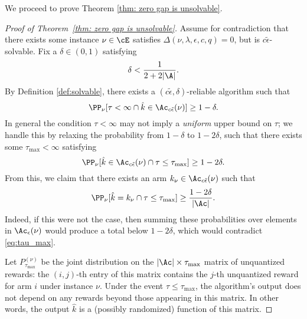 We proceed to prove Theorem \ref{thm: zero gap is unsolvable}.  
\begin{proof}[Proof of Theorem~\ref{thm: zero gap is unsolvable}]
Assume for contradiction that there exists some instance $\nu \in \cE$ satisfies $\Delta(\nu, \lambda, \epsilon, c, q) = 0 $, but is $c\tilde{\epsilon}$-solvable. 
Fix a $\delta \in (0, 1)$ satisfying
\begin{equation}
    \label{eq: delta very small}
    \delta < \frac{1}{2+2|\A|}.
\end{equation}
By Definition \ref{def:solvable}, there exists a $(c\tilde{\epsilon}, \delta)$-reliable algorithm such that
\begin{equation}
    \PP_{\nu}[\tau < \infty \cap \hat{k} \in \Ac_{c\tilde{\epsilon}}(\nu)] \ge 1-\delta.
\end{equation}
In general the condition $\tau < \infty$ may not imply a \emph{uniform} upper bound on $\tau$; we handle this by relaxing the probability from $1-\delta$ to $1-2\delta$, such that there exists some $\tau_{\max} < \infty$ satisfying
\begin{equation}
    \PP_{\nu}[\hat{k} \in \Ac_{c\tilde{\epsilon}}(\nu) \cap \tau \le \tau_{\max}] \ge 1-2\delta. \label{eq:tau_max}
\end{equation}
From this, we claim that there exists an arm $k_{\nu} \in \Ac_{c\tilde{\epsilon}}(\nu)$ such that
\begin{equation}
    \PP_{\nu}[\hat{k} = k_{\nu} \cap \tau \le \tau_{\max}] \ge \frac{1-2\delta}{|\Ac|}. 
    \label{eq:success_nu}
\end{equation}
Indeed, if this were not the case, then summing these probabilities over elements in $\Ac_{\epsilon}(\nu)$ would produce a total below $1-2\delta$, which would contradict \eqref{eq:tau_max}.


Let $P_{\tau_{\max}}^{(\nu)}$ be the joint distribution on the $|\Ac| \times \tau_{\max}$ matrix of unquantized rewards:
the $(i,j)$-th entry of this matrix contains the $j$-th unquantized reward for arm $i$ under instance $\nu$. Under the event $\tau \le \tau_{\max}$, the algorithm's output does not depend on any rewards beyond those appearing in this matrix.  In other words, the output $\hat{k}$ is a (possibly randomized) function of this matrix.


\end{proof}

